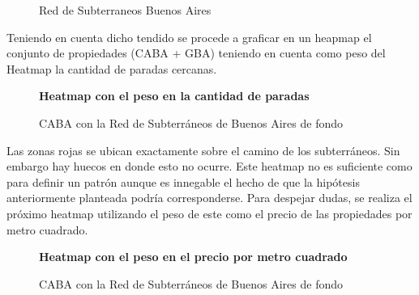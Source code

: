 \documentclass[a4paper, 10pt]{article}
\begin{document}
				\begin{figure}
    				\centering
    				\caption{Red de Subterraneos Buenos Aires}
				\end{figure}
				\FloatBarrier
				
				Teniendo en cuenta dicho tendido se procede a graficar en un heapmap el conjunto de propiedades 
				(CABA + GBA) teniendo en cuenta como peso del Heatmap la cantidad de paradas cercanas.
			
				\begin{figure}
    				\centering
    				\textbf{Heatmap con el peso en la cantidad de paradas}\par\medskip
    				\caption{CABA con la Red de Subterráneos de Buenos Aires de fondo}
				\end{figure}
				\FloatBarrier
				
				Las zonas rojas se ubican exactamente sobre el camino de 
				los subterráneos. Sin embargo hay huecos en donde esto no ocurre. 
				Este heatmap no es suficiente como para definir un patrón aunque 
				es innegable el hecho de que la hipótesis anteriormente planteada 
				podría corresponderse. Para despejar dudas, se realiza el próximo 
				heatmap utilizando el peso de este como el precio de las propiedades 
				por metro cuadrado.			
			
				\begin{figure}
    				\centering
    				\textbf{Heatmap con el peso en el precio por metro cuadrado}\par\medskip
    				\caption{CABA con la Red de Subterráneos de Buenos Aires de fondo}
				\end{figure}
				\FloatBarrier
				
\end{document}
